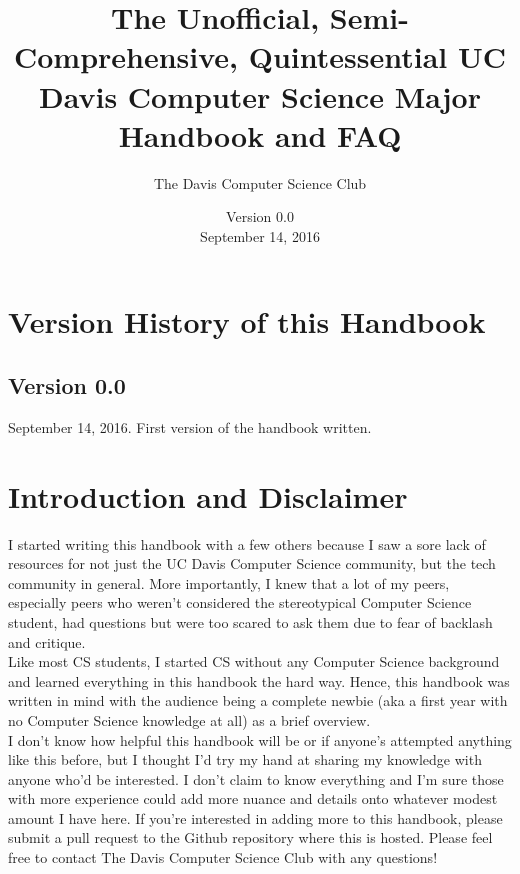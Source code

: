 \documentclass{article}
\title{The Unofficial, Semi-Comprehensive, Quintessential UC Davis Computer Science Major Handbook and FAQ}
\author{The Davis Computer Science Club}
\date{Version 0.0\\September 14, 2016}
\begin{document}
\begin{titlepage}
	\maketitle
\end{titlepage}

\tableofcontents

\pagebreak

\singlespacing
\sectionfont{\Large}
\subsectionfont{\large}

\section {Version History of this Handbook}
\subsection*{Version 0.0}
September 14, 2016. First version of the handbook written.
\newpage
\section{Introduction and Disclaimer}
\hspace{0.5cm}I started writing this handbook with a few others because I saw a sore lack of resources for not just the UC Davis Computer Science community, but the tech community in general. More importantly, I knew that a lot of my peers, especially peers who weren't considered the stereotypical Computer Science student, had questions but were too scared to ask them due to fear of backlash and critique. \\

Like most CS students, I started CS without any Computer Science background and learned everything in this handbook the hard way. Hence, this handbook was written in mind with the audience being a complete newbie (aka a first year with no Computer Science knowledge at all) as a brief overview. \\

I don't know how helpful this handbook will be or if anyone's attempted anything like this before, but I thought I'd try my hand at sharing my knowledge with anyone who'd be interested. I don't claim to know everything and I'm sure those with more experience could add more nuance and details onto whatever modest amount I have here. If you're interested in adding more to this handbook, please submit a pull request to the Github repository where this is hosted. Please feel free to contact The Davis Computer Science Club with any questions! 
\end{document}
